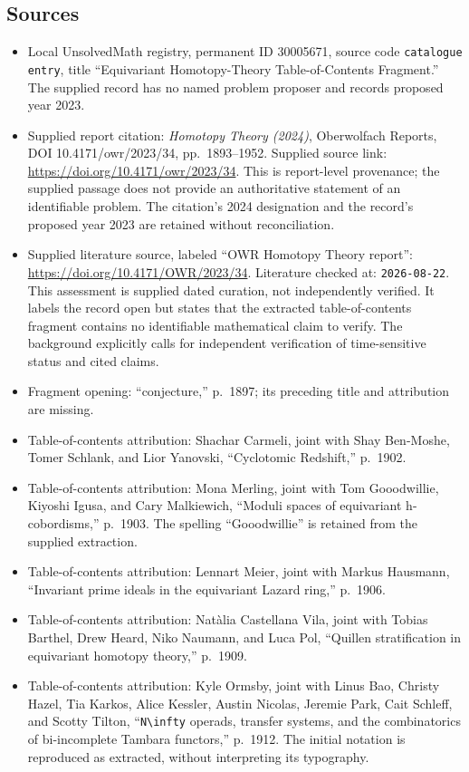 \documentclass[11pt]{article}
\begin{document}
\subsection{Sources}
\begin{itemize}
\item Local UnsolvedMath registry, permanent ID 30005671, source code \texttt{catalogue entry}, title ``Equivariant Homotopy-Theory Table-of-Contents Fragment.'' The supplied record has no named problem proposer and records proposed year 2023.
\item Supplied report citation: \emph{Homotopy Theory (2024)}, Oberwolfach Reports, DOI 10.4171/owr/2023/34, pp.~1893--1952. Supplied source link: \url{https://doi.org/10.4171/owr/2023/34}. This is report-level provenance; the supplied passage does not provide an authoritative statement of an identifiable problem. The citation's 2024 designation and the record's proposed year 2023 are retained without reconciliation.
\item Supplied literature source, labeled ``OWR Homotopy Theory report'': \url{https://doi.org/10.4171/OWR/2023/34}. Literature checked at: \texttt{2026-08-22}. This assessment is supplied dated curation, not independently verified. It labels the record open but states that the extracted table-of-contents fragment contains no identifiable mathematical claim to verify. The background explicitly calls for independent verification of time-sensitive status and cited claims.
\item Fragment opening: ``conjecture,'' p.~1897; its preceding title and attribution are missing.
\item Table-of-contents attribution: Shachar Carmeli, joint with Shay Ben-Moshe, Tomer Schlank, and Lior Yanovski, ``Cyclotomic Redshift,'' p.~1902.
\item Table-of-contents attribution: Mona Merling, joint with Tom Gooodwillie, Kiyoshi Igusa, and Cary Malkiewich, ``Moduli spaces of equivariant h-cobordisms,'' p.~1903. The spelling ``Gooodwillie'' is retained from the supplied extraction.
\item Table-of-contents attribution: Lennart Meier, joint with Markus Hausmann, ``Invariant prime ideals in the equivariant Lazard ring,'' p.~1906.
\item Table-of-contents attribution: Natàlia Castellana Vila, joint with Tobias Barthel, Drew Heard, Niko Naumann, and Luca Pol, ``Quillen stratification in equivariant homotopy theory,'' p.~1909.
\item Table-of-contents attribution: Kyle Ormsby, joint with Linus Bao, Christy Hazel, Tia Karkos, Alice Kessler, Austin Nicolas, Jeremie Park, Cait Schleff, and Scotty Tilton, ``\texttt{N\textbackslash infty} operads, transfer systems, and the combinatorics of bi-incomplete Tambara functors,'' p.~1912. The initial notation is reproduced as extracted, without interpreting its typography.

\end{itemize}
\end{document}

